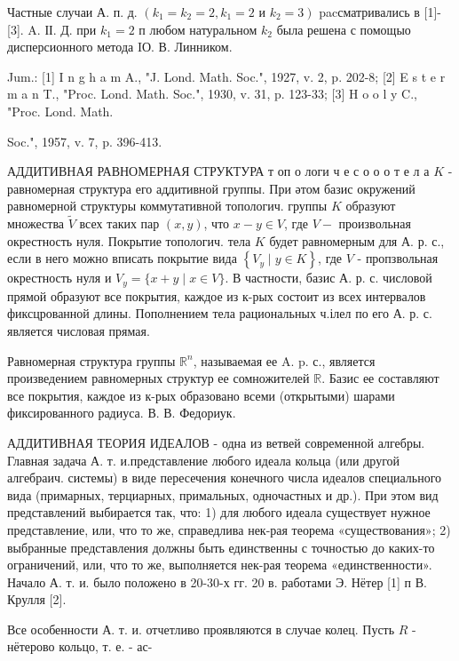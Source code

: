 \documentclass[10pt]{article}
\begin{document}
Частные случаи А. п. д. $\left(k_{1}=k_{2}=2, k_{1}=2\right.$ и $\left.k_{2}=3\right)$ pacсматривались в [1]-[3]. A. ІІ. Д. при $k_{1}=2$ п любом натуральном $k_{2}$ была решена с помощыо дисперсионного метода IО. В. Линником.



Jum.: [1] I n g h a m A., "J. Lond. Math. Soc.", 1927, v. 2, p. 202-8; [2] E s t e r m a n T., "Proc. Lond. Math. Soc.", 1930, v. 31, p. 123-33; [3] H o o l y C., "Proc. Lond. Math.

Soc.", 1957, v. 7, p. 396-413.



АДДИТИВНАЯ РАВНОМЕРНАЯ СТРУКТУРА т оп о логи ч е с о о о т е л а $K$ - равномерная структура его аддитивной группы. При әтом базис окружений равномерной структуры коммутативной топологич. группы $K$ образуют множества $\tilde{V}$ всех таких пар $(x, y)$, что $x-y \in V$, где $V-$ произвольная окрестность нуля. Покрытие топологич. тела $K$ будет равномерным для А. р. с., если в него можно вписать покрытие вида $\left\{V_{y} \mid y \in K\right\}$, где $V$ - пропзвольная окрестность нуля и $V_{y}=\{x+y \mid x \in V\}$. В частности, базис А. р. с. числовой прямой образуют все покрытия, каждое из к-рых состоит из всех интервалов фиксцрованной длины. Пополнением тела рациональных ч.ілел по его А. р. с. является числовая прямая.



Равномерная структура группы $\mathbb{R}^{n}$, называемая ее A. p. с., является произведением равномерных структур ее сомножителей $\mathbb{R}$. Базис ее составляют все покрытия, каждое из к-рых образовано всеми (открытыми) шарами фиксированного радиуса. В. В. Федориук.



АДДИТИВНАЯ ТЕОРИЯ ИДЕАЛОВ - одна из ветвей современной алгебры. Главная задача А. т. и.представление любого идеала кольца (или другой алгебраич. системы) в виде пересечения конечного числа идеалов специального вида (примарных, терциарных, примальных, одночастных и др.). При этом вид представлений выбирается так, что: 1) для любого идеала существует нужное представление, или, что то же, справедлива нек-рая теорема «существования»; 2) выбранные представления должны быть единственны с точностью до каких-то ограничений, или, что то же, выполняется нек-рая теорема «единственности». Начало А. т. и. было положено в 20-30-х гг. 20 в. работами Э. Нётер [1] п В. Крулля [2].



Все особенности А. т. и. отчетливо проявляются в случае колец. Пусть $R$ - нётерово кольцо, т. е. - ас-
\end{document}
